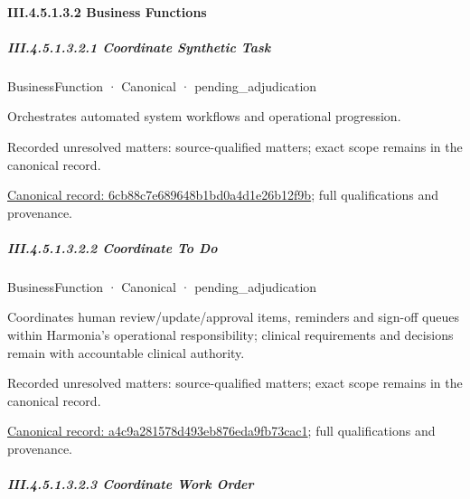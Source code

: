 \paragraph*{III.4.5.1.3.2 Business Functions}
\label{navigation:III.4.5.1.3.2}

\subparagraph*{III.4.5.1.3.2.1 Coordinate Synthetic Task}
\label{navigation:III.4.5.1.3.2.1}

\label{element:6cb88c7e689648b1bd0a4d1e26b12f9b}
{\small BusinessFunction · Canonical · pending\_adjudication}\par

Orchestrates automated system workflows and operational progression.


{\small Recorded unresolved matters: source-qualified matters; exact scope remains in the canonical record.}\par
{\footnotesize \href{../../../../continuum/business/business-function/6cb88c7e689648b1bd0a4d1e26b12f9b.md}{Canonical record: 6cb88c7e689648b1bd0a4d1e26b12f9b}; full qualifications and provenance.}\par
\subparagraph*{III.4.5.1.3.2.2 Coordinate To Do}
\label{navigation:III.4.5.1.3.2.2}

\label{element:a4c9a281578d493eb876eda9fb73cac1}
{\small BusinessFunction · Canonical · pending\_adjudication}\par

Coordinates human review/update/approval items, reminders and sign-off queues within Harmonia's operational responsibility; clinical requirements and decisions remain with accountable clinical authority.


{\small Recorded unresolved matters: source-qualified matters; exact scope remains in the canonical record.}\par
{\footnotesize \href{../../../../continuum/business/business-function/a4c9a281578d493eb876eda9fb73cac1.md}{Canonical record: a4c9a281578d493eb876eda9fb73cac1}; full qualifications and provenance.}\par
\subparagraph*{III.4.5.1.3.2.3 Coordinate Work Order}
\label{navigation:III.4.5.1.3.2.3}

